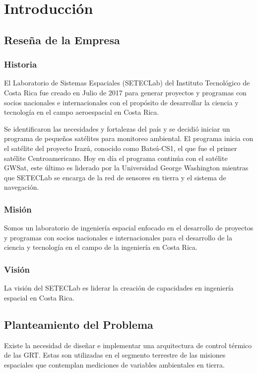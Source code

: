 \chapter{Introducción}

\section{Reseña de la Empresa}
\subsection{Historia}
El Laboratorio de Sistemas Espaciales (SETECLab) del Instituto Tecnológico de Costa Rica fue creado en Julio de 2017 para generar proyectos y programas con socios nacionales e internacionales con el propósito de desarrollar la ciencia y tecnología en el campo aeroespacial en Costa Rica.

Se identificaron las necesidades y fortalezas del país y se decidió iniciar un programa de pequeños satélites para monitoreo ambiental. El programa inicia con el satélite del proyecto Irazú, conocido como Batsú-CS1, el que fue el primer satélite Centroamericano. Hoy en día el programa continúa con el satélite GWSat, este último es liderado por la Universidad George Washington mientras que SETECLab se encarga de la red de sensores en tierra y el sistema de navegación.

\subsection{Misión}
Somos un laboratorio de ingeniería espacial enfocado en el desarrollo de proyectos y programas con socios nacionales e internacionales para el desarrollo de la ciencia y tecnología en el campo de la ingeniería en Costa Rica.

\subsection{Visión}
La visión del SETECLab es liderar la creación de capacidades en ingeniería espacial en Costa Rica.

\section{Planteamiento del Problema}
Existe la necesidad de diseñar e implementar una arquitectura de control térmico de las GRT. Estas son utilizadas en el segmento terrestre de las misiones espaciales que contemplan mediciones de variables ambientales en tierra.

